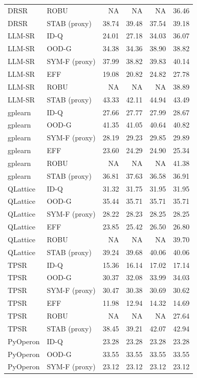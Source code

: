 \begin{tabular}{llrrrr}
DRSR & ROBU & NA & NA & NA & 36.46 \\
DRSR & STAB (proxy) & 38.74 & 39.48 & 37.54 & 39.18 \\
LLM-SR & ID-Q & 24.01 & 27.18 & 34.03 & 36.07 \\
LLM-SR & OOD-G & 34.38 & 34.36 & 38.90 & 38.82 \\
LLM-SR & SYM-F (proxy) & 37.99 & 38.82 & 39.83 & 40.14 \\
LLM-SR & EFF & 19.08 & 20.82 & 24.82 & 27.78 \\
LLM-SR & ROBU & NA & NA & NA & 38.89 \\
LLM-SR & STAB (proxy) & 43.33 & 42.11 & 44.94 & 43.49 \\
gplearn & ID-Q & 27.66 & 27.77 & 27.99 & 28.67 \\
gplearn & OOD-G & 41.35 & 41.05 & 40.64 & 40.82 \\
gplearn & SYM-F (proxy) & 28.19 & 29.23 & 29.85 & 29.89 \\
gplearn & EFF & 23.60 & 24.29 & 24.90 & 25.34 \\
gplearn & ROBU & NA & NA & NA & 41.38 \\
gplearn & STAB (proxy) & 36.81 & 37.63 & 36.58 & 36.91 \\
QLattice & ID-Q & 31.32 & 31.75 & 31.95 & 31.95 \\
QLattice & OOD-G & 35.44 & 35.71 & 35.71 & 35.71 \\
QLattice & SYM-F (proxy) & 28.22 & 28.23 & 28.25 & 28.25 \\
QLattice & EFF & 23.85 & 25.42 & 26.50 & 26.80 \\
QLattice & ROBU & NA & NA & NA & 39.70 \\
QLattice & STAB (proxy) & 39.24 & 39.68 & 40.06 & 40.06 \\
TPSR & ID-Q & 15.36 & 16.14 & 17.02 & 17.14 \\
TPSR & OOD-G & 30.37 & 32.08 & 33.99 & 34.03 \\
TPSR & SYM-F (proxy) & 30.47 & 30.38 & 30.69 & 30.62 \\
TPSR & EFF & 11.98 & 12.94 & 14.32 & 14.69 \\
TPSR & ROBU & NA & NA & NA & 27.64 \\
TPSR & STAB (proxy) & 38.45 & 39.21 & 42.07 & 42.94 \\
PyOperon & ID-Q & 23.28 & 23.28 & 23.28 & 23.28 \\
PyOperon & OOD-G & 33.55 & 33.55 & 33.55 & 33.55 \\
PyOperon & SYM-F (proxy) & 23.12 & 23.12 & 23.12 & 23.12 \\

\end{tabular}
